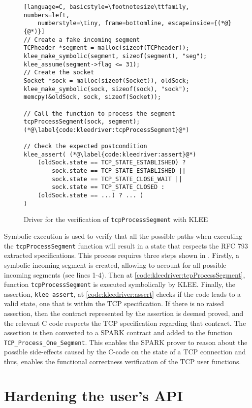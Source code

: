 \documentclass[conference]{IEEEtran}
\def\spark#1{\lstinline[language=Ada]{#1}}
\begin{document}
\begin{figure}
\begin{lstlisting}[language=C, basicstyle=\footnotesize\ttfamily, numbers=left,
    numberstyle=\tiny, frame=bottomline, escapeinside={(*@}{@*)}]
// Create a fake incoming segment
TCPheader *segment = malloc(sizeof(TCPheader));
klee_make_symbolic(segment, sizeof(segment), "seg");
klee_assume(segment->flag <= 31);
// Create the socket
Socket *sock = malloc(sizeof(Socket)), oldSock;
klee_make_symbolic(sock, sizeof(sock), "sock");
memcpy(&oldSock, sock, sizeof(Socket));

// Call the function to process the segment
tcpProcessSegment(sock, segment); (*@\label{code:kleedriver:tcpProcessSegment}@*)

// Check the expected postcondition
klee_assert( (*@\label{code:kleedriver:assert}@*)
    (oldSock.state == TCP_STATE_ESTABLISHED) ?
        sock.state == TCP_STATE_ESTABLISHED ||
        sock.state == TCP_STATE_CLOSE_WAIT ||
        sock.state == TCP_STATE_CLOSED :
    (oldSock.state == ...) ? ... )
)
\end{lstlisting}
\caption{Driver for the verification of \lstinline[language=C]{tcpProcessSegment}
with KLEE}
\label{code:kleedriver}
\end{figure}

Symbolic execution is used to verify that all the possible paths when executing the \spark{tcpProcessSegment} function will result in a state that respects the RFC 793 extracted specifications. This process requires three steps shown in . Firstly, a symbolic incoming segment is created, allowing to account for all possible incoming segments (see lines 1-4). Then at \cref{code:kleedriver:tcpProcessSegment}, function \texttt{tcpProcessSegment} is executed symbolically by KLEE. Finally, the assertion, \texttt{klee\_assert}, at \cref{code:kleedriver:assert} checks if the code leads to a valid state, one that is within the TCP specification. If there is no raised assertion, then the contract represented by the assertion is deemed proved, and the relevant C code respects the TCP specification regarding that contract. The assertion is then converted to a SPARK contract and added to the function \spark{TCP_Process_One_Segment}. This enables the SPARK prover to reason about the possible side-effects caused by the C-code on the state of a TCP connection and thus, enables the functional correctness verification of the TCP user functions.

\section{Hardening the user's API}
\label{sec:API}
\end{document}
